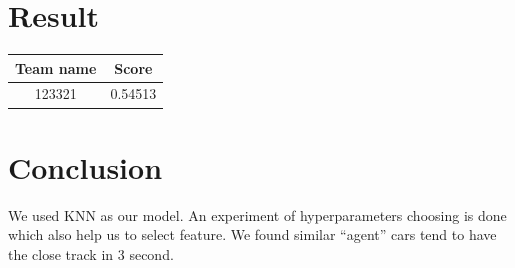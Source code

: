 \section{Result}
    \begin{center}
        \begin{tabular}{|c | c |} 
        \hline
        Team name & Score \\ [0.5ex]
        \hline\hline
        123321 &  0.54513\\
        \hline 
        \end{tabular}
    \end{center}
\section{Conclusion}
    We used KNN as our model. An experiment of hyperparameters choosing is done which also help us to select feature. We found similar ``agent'' cars tend to have the close track in 3 second.


